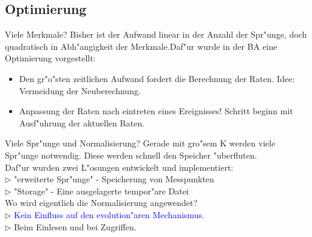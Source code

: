 \documentclass{beamer}
\begin{document}
\subsection{Optimierung}
\begin{frame}{Viele Merkmale?}
Bisher ist der Aufwand linear in der Anzahl der Spr"unge, doch quadratisch in Abh"angigkeit der Merkmale.\pause Daf"ur wurde in der BA eine Optimierung vorgestellt:
	\begin{itemize}
		\item Den gr"o"sten zeitlichen Aufwand fordert die Berechnung der Raten. Idee: Vermeidung der Neuberechnung.\pause
		\item Anpassung der Raten nach eintreten eines Ereignisses! Schritt beginn mit Ausf"uhrung der aktuellen Raten.
	\end{itemize}
\end{frame}

\begin{frame}{Viele Spr"unge und Normalisierung?}
Gerade mit gro"sem K werden viele Spr"unge notwendig. Diese werden schnell den Speicher "uberfluten.\pause\bigskip\\
Daf"ur wurden zwei L"osungen entwickelt und implementiert:\\
$ \rhd $ "{}erweiterte Spr"unge"{} - Speicherung von Messpunkten\\
$ \rhd $ "{}Storage"{} - Eine ausgelagerte tempor"are Datei\bigskip\\\pause
Wo wird eigentlich die Normalisierung angewendet?\\\pause
$ \rhd $ \textcolor{blue}{Kein Einfluss auf den evolution"aren Mechanismus}.\\
$ \rhd $ Beim Einlesen und bei Zugriffen.\\
\end{frame}
\end{document}
